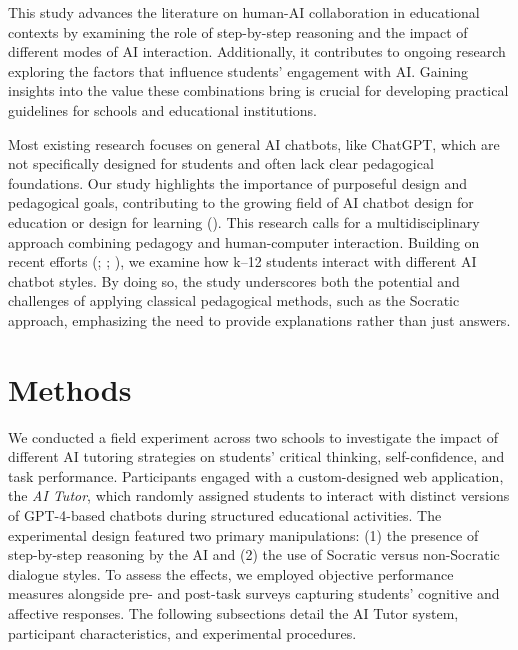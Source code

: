 \documentclass[
  12pt,
]{article}
\begin{document}
This study advances the literature on human-AI collaboration in educational contexts by examining the role of step-by-step reasoning and the impact of different modes of AI interaction. Additionally, it contributes to ongoing research exploring the factors that influence students' engagement with AI. Gaining insights into the value these combinations bring is crucial for developing practical guidelines for schools and educational institutions.

Most existing research focuses on general AI chatbots, like ChatGPT, which are not specifically designed for students and often lack clear pedagogical foundations. Our study highlights the importance of purposeful design and pedagogical goals, contributing to the growing field of AI chatbot design for education or design for learning (). This research calls for a multidisciplinary approach combining pedagogy and human-computer interaction. Building on recent efforts (; ; ), we examine how k--12 students interact with different AI chatbot styles. By doing so, the study underscores both the potential and challenges of applying classical pedagogical methods, such as the Socratic approach, emphasizing the need to provide explanations rather than just answers.

\section{Methods}\label{sec:methods}

We conducted a field experiment across two schools to investigate the impact of different AI tutoring strategies on students' critical thinking, self-confidence, and task performance. Participants engaged with a custom-designed web application, the \emph{AI Tutor}, which randomly assigned students to interact with distinct versions of GPT-4-based chatbots during structured educational activities. The experimental design featured two primary manipulations: (1) the presence of step-by-step reasoning by the AI and (2) the use of Socratic versus non-Socratic dialogue styles. To assess the effects, we employed objective performance measures alongside pre- and post-task surveys capturing students' cognitive and affective responses. The following subsections detail the AI Tutor system, participant characteristics, and experimental procedures.
\end{document}
